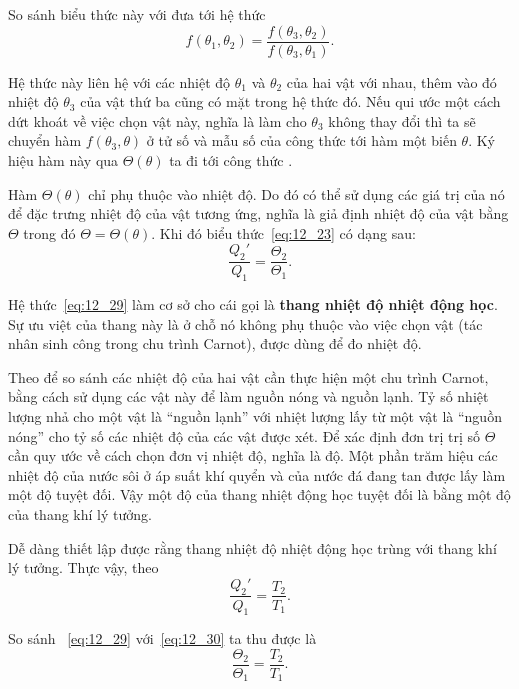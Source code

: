 \noindent
So sánh biểu thức này với  đưa tới hệ thức
\begin{equation}\label{eq:12_28}
	f(\theta_1,\theta_2) = \frac{f(\theta_3,\theta_2)}{f(\theta_3,\theta_1)}.
\end{equation}

\noindent
Hệ thức này liên hệ với các nhiệt độ $\theta_1$ và $\theta_2$ của hai vật với nhau, thêm vào đó nhiệt độ $\theta_3$ của vật thứ ba cũng có mặt trong hệ thức đó. Nếu qui ước một cách dứt khoát về việc chọn vật này, nghĩa là làm cho $\theta_3$ không thay đổi thì ta sẽ chuyển hàm $f(\theta_3,\theta)$ ở tử số và mẫu số của công thức  tới hàm một biến $\theta$. Ký hiệu hàm này qua $\Theta(\theta)$ ta đi tới công thức .

Hàm $\Theta(\theta)$ chỉ phụ thuộc vào nhiệt độ. Do đó có thể sử dụng các giá trị của nó để đặc trưng nhiệt độ của vật tương ứng, nghĩa là giả định nhiệt độ của vật bằng $\Theta$ trong đó $\Theta=\Theta(\theta)$. Khi đó biểu thức~\eqref{eq:12_23} có dạng sau:
\begin{equation}\label{eq:12_29}
	\frac{Q_2'}{Q_1} = \frac{\Theta_2}{\Theta_1}.
\end{equation}

\noindent
Hệ thức~\eqref{eq:12_29} làm cơ sở cho cái gọi là \textbf{thang nhiệt độ nhiệt động học}. Sự ưu việt của thang này là ở chỗ nó không phụ thuộc vào việc chọn vật (tác nhân sinh công trong chu trình Carnot), được dùng để đo nhiệt độ.

Theo  để so sánh các nhiệt độ của hai vật cần thực hiện một chu trình Carnot, bằng cách sử dụng các vật này để làm nguồn nóng và nguồn lạnh. Tỷ số nhiệt lượng nhả cho một vật là ``nguồn lạnh'' với nhiệt lượng lấy từ một vật là ``nguồn nóng'' cho tỷ số các nhiệt độ của các vật được xét. Để xác định đơn trị trị số $\Theta$ cần quy ước về cách chọn đơn vị nhiệt độ, nghĩa là độ. Một phần trăm hiệu các nhiệt độ của nước sôi ở áp suất khí quyển và của nước đá đang tan được lấy làm một độ tuyệt đối. Vậy một độ của thang nhiệt động học tuyệt đối là bằng một độ của thang khí lý tưởng.

Dễ dàng thiết lập được rằng thang nhiệt độ nhiệt động học trùng với thang khí lý tưởng. Thực vậy, theo 
\begin{equation}\label{eq:12_30}
	\frac{Q_2'}{Q_1} = \frac{T_2}{T_1}.
\end{equation}

\noindent
So sánh ~\eqref{eq:12_29} với~\eqref{eq:12_30} ta thu được là
\begin{equation*}
	\frac{\Theta_2}{\Theta_1} = \frac{T_2}{T_1}.
\end{equation*}

